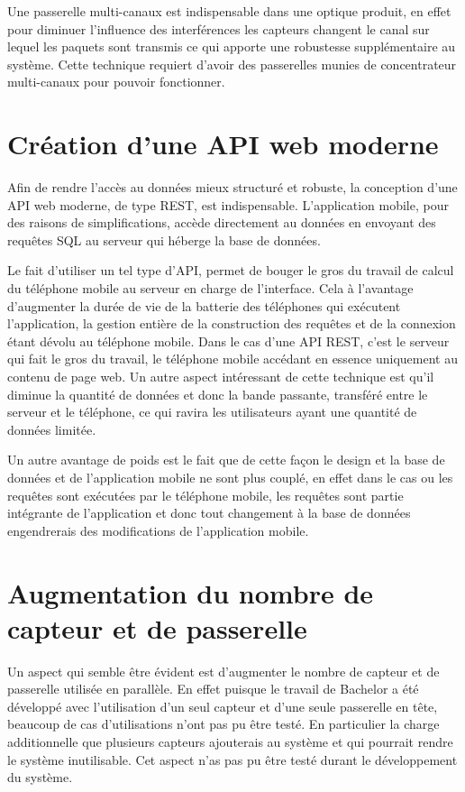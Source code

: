 Une passerelle multi-canaux est indispensable dans une optique produit, en effet pour diminuer l’influence des interférences les capteurs changent le canal sur lequel les paquets sont transmis ce qui apporte une robustesse supplémentaire au système. Cette technique requiert d'avoir des passerelles munies de concentrateur multi-canaux pour pouvoir fonctionner.

\section{Création d'une API web moderne}

Afin de rendre l'accès au données mieux structuré et robuste, la conception d'une API web moderne, de type REST, est indispensable. L'application mobile, pour des raisons de simplifications, accède directement au données en envoyant des requêtes SQL au serveur qui héberge la base de données.

Le fait d'utiliser un tel type d'API, permet de bouger le gros du travail de calcul du téléphone mobile au serveur en charge de l'interface. Cela à l'avantage d'augmenter la durée de vie de la batterie des téléphones qui exécutent l'application, la gestion entière de la construction des requêtes et de la connexion étant dévolu au téléphone mobile. Dans le cas d'une API REST, c'est le serveur qui fait le gros du travail, le téléphone mobile accédant en essence uniquement au contenu de page web. Un autre aspect intéressant de cette technique est qu'il diminue la quantité de données et donc la bande passante, transféré entre le serveur et le téléphone, ce qui ravira les utilisateurs ayant une quantité de données limitée.

Un autre avantage de poids est le fait que de cette façon le design et la base de données et de l'application mobile ne sont plus couplé, en effet dans le cas ou les requêtes sont exécutées par le téléphone mobile, les requêtes sont partie intégrante de l'application et donc tout changement à la base de données engendrerais des modifications de l'application mobile.

\section{Augmentation du nombre de capteur et de passerelle}

Un aspect qui semble être évident est d'augmenter le nombre de capteur et de passerelle utilisée en parallèle. En effet puisque le travail de Bachelor a été développé avec l'utilisation d'un seul capteur et d'une seule passerelle en tête, beaucoup de cas d'utilisations n'ont pas pu être testé. En particulier la charge additionnelle que plusieurs capteurs ajouterais au système et qui pourrait rendre le système inutilisable. Cet aspect n'as pas pu être testé durant le développement du système.

